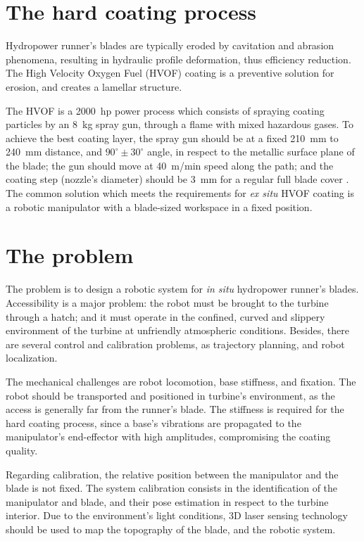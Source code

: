 \section{The hard coating process}\label{hvof}

Hydropower runner's blades are typically eroded by cavitation and abrasion
phenomena, resulting in hydraulic profile deformation, thus efficiency
reduction. The High Velocity Oxygen Fuel (HVOF) coating is a preventive
solution for erosion, and creates a lamellar structure. 

The HVOF is a 2000~hp power process which consists of
spraying coating particles by an 8~kg spray gun, through a flame with mixed
hazardous gases. To achieve the best coating layer, the spray gun should be at
a fixed 210~mm to 240~mm distance, and $90^\circ \pm 30^\circ$ angle, in respect
to the metallic surface plane of the blade; the gun should move at 40~m/min
speed along the path; and the coating step (nozzle's diameter) should be 3~mm
for a regular full blade cover \cite{li2002effect}. The
common solution which meets the requirements for \textit{ex situ} HVOF coating
is a robotic manipulator with a blade-sized workspace in a fixed position.

\section{The problem}\label{problem}

The problem is to design a robotic system for \textit{in situ}
hydropower runner's blades. Accessibility is a major problem: the robot must be
brought to the turbine through a hatch; and it must operate in the confined,
curved and slippery environment of the turbine at unfriendly atmospheric
conditions. Besides, there are several control and calibration problems, as
trajectory planning, and robot localization.

The mechanical challenges are robot locomotion, base stiffness, and
fixation. The robot should be transported and positioned in turbine's
environment, as the access is generally far from the runner's blade.
The stiffness is required for the hard coating process, since a base's
vibrations are propagated to the manipulator's end-effector with high
amplitudes, compromising the coating quality. 

Regarding calibration, the relative position between the manipulator and the
blade is not fixed. The system calibration consists in the identification of
the manipulator and blade, and their pose estimation in respect to the turbine
interior. Due to the environment's light conditions, 3D laser sensing
technology should be used to map the topography of the blade, and the robotic
system. 

